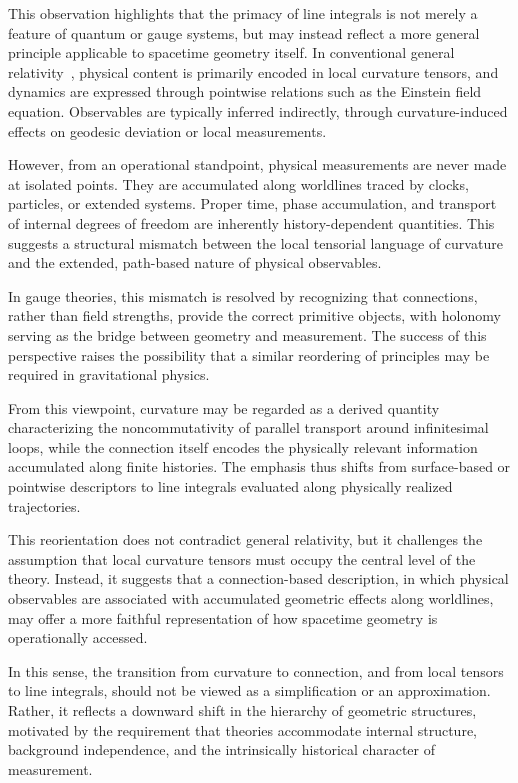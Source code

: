 \documentclass[%
 reprint,
 amsmath,amssymb,
 aps,
 prb,
]{revtex4-2}
\numberwithin{equation}{section}
\begin{document}
This observation highlights that the primacy of line integrals is not merely a feature of quantum or gauge systems, but may instead reflect a more general principle applicable to spacetime geometry itself. In conventional general relativity~\cite{Wald}, physical content is primarily encoded in local curvature tensors, and dynamics are expressed through pointwise relations such as the Einstein field equation. Observables are typically inferred indirectly, through curvature-induced effects on geodesic deviation or local measurements.

However, from an operational standpoint, physical measurements are never made at isolated points. They are accumulated along worldlines traced by clocks, particles, or extended systems. Proper time, phase accumulation, and transport of internal degrees of freedom are inherently history-dependent quantities. This suggests a structural mismatch between the local tensorial language of curvature and the extended, path-based nature of physical observables.

In gauge theories, this mismatch is resolved by recognizing that connections, rather than field strengths, provide the correct primitive objects, with holonomy serving as the bridge between geometry and measurement. The success of this perspective raises the possibility that a similar reordering of principles may be required in gravitational physics.

From this viewpoint, curvature may be regarded as a derived quantity characterizing the noncommutativity of parallel transport around infinitesimal loops, while the connection itself encodes the physically relevant information accumulated along finite histories. The emphasis thus shifts from surface-based or pointwise descriptors to line integrals evaluated along physically realized trajectories.

This reorientation does not contradict general relativity, but it challenges the assumption that local curvature tensors must occupy the central level of the theory. Instead, it suggests that a connection-based description, in which physical observables are associated with accumulated geometric effects along worldlines, may offer a more faithful representation of how spacetime geometry is operationally accessed.

In this sense, the transition from curvature to connection, and from local tensors to line integrals, should not be viewed as a simplification or an approximation. Rather, it reflects a downward shift in the hierarchy of geometric structures, motivated by the requirement that theories accommodate internal structure, background independence, and the intrinsically historical character of measurement.
\end{document}

